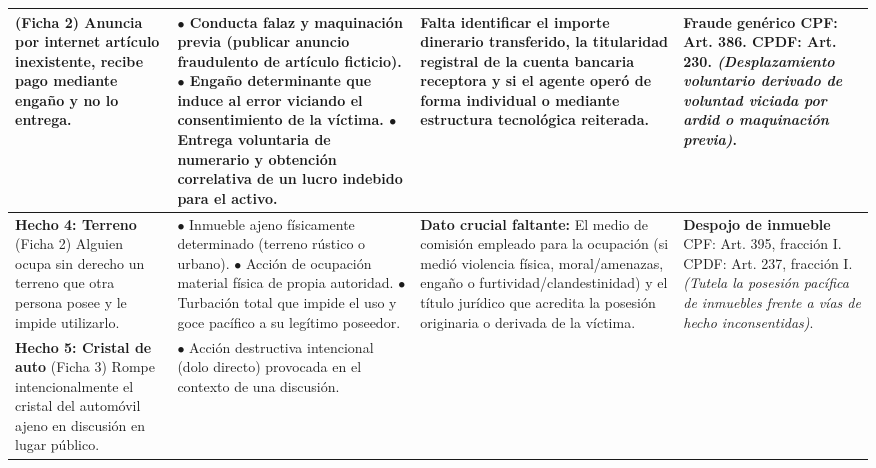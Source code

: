 \documentclass[spanish,letterpaper,oneside]{article}
\begin{document}
\begin{landscape}
\begin{longtable}{@{}L{3.3cm} L{6.15cm} L{6.15cm} L{6.15cm}@{}}
(Ficha 2)\newline
Anuncia por internet art\'iculo inexistente, recibe pago mediante enga\~no y no lo entrega. & 
$\bullet$ Conducta falaz y maquinaci\'on previa (publicar anuncio fraudulento de art\'iculo ficticio).\newline
$\bullet$ Enga\~no determinante que induce al error viciando el consentimiento de la v\'ictima.\newline
$\bullet$ Entrega voluntaria de numerario y obtenci\'on correlativa de un lucro indebido para el activo. & 
Falta identificar el importe dinerario transferido, la titularidad registral de la cuenta bancaria receptora y si el agente oper\'o de forma individual o mediante estructura tecnol\'ogica reiterada. & 
\textbf{Fraude gen\'erico}\newline
CPF: Art. 386.\newline
CPDF: Art. 230.\newline
\emph{(Desplazamiento voluntario derivado de voluntad viciada por ardid o maquinaci\'on previa)}. \\
\midrule
{}
\textbf{Hecho 4: Terreno}\newline
(Ficha 2)\newline
Alguien ocupa sin derecho un terreno que otra persona posee y le impide utilizarlo. & 
$\bullet$ Inmueble ajeno f\'isicamente determinado (terreno r\'ustico o urbano).\newline
$\bullet$ Acci\'on de ocupaci\'on material f\'isica de propia autoridad.\newline
$\bullet$ Turbaci\'on total que impide el uso y goce pac\'ifico a su leg\'itimo poseedor. & 
\textbf{Dato crucial faltante:} El medio de comisi\'on empleado para la ocupaci\'on (si medi\'o violencia f\'isica, moral/amenazas, enga\~no o furtividad/clandestinidad) y el t\'itulo jur\'idico que acredita la posesi\'on originaria o derivada de la v\'ictima. & 
\textbf{Despojo de inmueble}\newline
CPF: Art. 395, fracci\'on I.\newline
CPDF: Art. 237, fracci\'on I.\newline
\emph{(Tutela la posesi\'on pac\'ifica de inmuebles frente a v\'ias de hecho inconsentidas)}. \\
\midrule
\textbf{Hecho 5: Cristal de auto}\newline
(Ficha 3)\newline
Rompe intencionalmente el cristal del autom\'ovil ajeno en discusi\'on en lugar p\'ublico. & 
$\bullet$ Acci\'on destructiva intencional (dolo directo) provocada en el contexto de una discusi\'on.\newline

\end{longtable}
\end{landscape}
\end{document}
